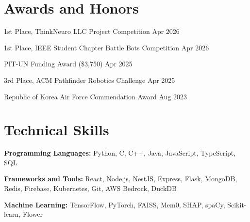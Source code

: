 \documentclass[11pt,a4paper]{article}
\begin{document}
\section*{Awards and Honors}

1st Place, ThinkNeuro LLC Project Competition \hfill Apr 2026

1st Place, IEEE Student Chapter Battle Bots Competition \hfill Apr 2026

PIT-UN Funding Award (\$3,750) \hfill Apr 2025

3rd Place, ACM Pathfinder Robotics Challenge \hfill Apr 2025

Republic of Korea Air Force Commendation Award \hfill Aug 2023


\section*{Technical Skills}

\textbf{Programming Languages:} Python, C, C++, Java, JavaScript, TypeScript, SQL

\vspace{0.3em}

\textbf{Frameworks and Tools:} React, Node.js, NestJS, Express, Flask, MongoDB, Redis, Firebase, Kubernetes, Git, AWS Bedrock, DuckDB

\vspace{0.3em}

\textbf{Machine Learning:} TensorFlow, PyTorch, FAISS, Mem0, SHAP, spaCy, Scikit-learn, Flower
\end{document}
